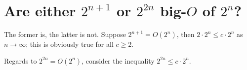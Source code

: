 \section[Problem 4]{Are either $2^{n + 1}$ or $2^{2n}$ big-$O$ of $2^n$?}

The former is, the latter is not. Suppose $2^{n + 1} = O(2^n)$, then $2 \cdot 2^n \leq c \cdot 2^n$ as $n \rightarrow \infty$; this is obviously true for all $c \geq 2$. 

Regards to $2^{2n} = O(2^n)$, consider the inequality $2^{2n} \leq c \cdot 2^n$.
